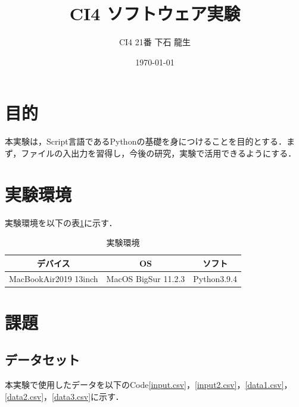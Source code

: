 \documentclass[a4paper,11pt]{jsarticle}
\begin{document}
\title{CI4 ソフトウェア実験}
\author{CI4 21番 下石 龍生}
\date{\today}
\maketitle


\section{目的}
本実験は，Script言語であるPythonの基礎を身につけることを目的とする．まず，ファイルの入出力を習得し，今後の研究，実験で活用できるようにする．

\section{実験環境}
実験環境を以下の表\ref{em}に示す．
\begin{table}[H]
  \begin{center}
    \caption{実験環境}
    \begin{tabular}{|c|c|c|}  \hline 
      デバイス &  OS & ソフト \\ \hline 
      MacBookAir2019 13inch &  MacOS BigSur 11.2.3 & Python3.9.4 \\ \hline
    \end{tabular}
    \label{em}
  \end{center}
\end{table}

\section{課題}
\subsection{データセット}
  本実験で使用したデータを以下のCode\ref{input.csv}，\ref{input2.csv}，\ref{data1.csv}，\ref{data2.csv}，\ref{data3.csv}に示す．
  
  
  
  
  
\end{document}
